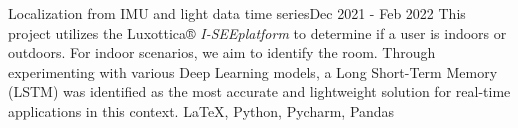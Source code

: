 %
%
%



\begin{projects}
    \projectNoLink
        {Localization from IMU and light data time series}{Dec 2021 - Feb 2022}
        {This project utilizes the Luxottica® \textit{I-SEEplatform} to determine if a user is indoors or outdoors. For indoor scenarios, we aim to identify the room. Through experimenting with various Deep Learning models, a Long Short-Term Memory (LSTM) was identified as the most accurate and lightweight solution for real-time applications in this context.}
        {\LaTeX, Python, Pycharm, Pandas}
    	
	
				
    	
    	
    	

\end{projects}
